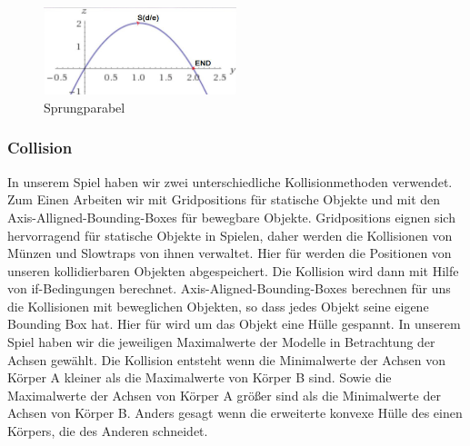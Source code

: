 \documentclass[10pt]{article}
\begin{document}
\begin{figure}[H]
	\centering
	\includegraphics[width=0.5\textwidth]{parabel}
	\caption{Sprungparabel
		\label{fig:parabel}}
\end{figure}

\vspace{0.5cm}
\subsubsection{Collision}

In unserem Spiel haben wir zwei unterschiedliche Kollisionmethoden verwendet.
Zum Einen Arbeiten wir mit Gridpositions für statische Objekte und mit den
Axis-Alligned-Bounding-Boxes für bewegbare Objekte.\newline
\newline
Gridpositions eignen sich hervorragend für statische Objekte in Spielen, daher werden die Kollisionen
von Münzen und Slowtraps von ihnen verwaltet. Hier für werden die Positionen von unseren kollidierbaren
Objekten abgespeichert. Die Kollision wird dann mit Hilfe von if-Bedingungen berechnet.\newline
\newline
Axis-Aligned-Bounding-Boxes berechnen für uns die Kollisionen mit beweglichen Objekten, so dass jedes Objekt seine eigene
Bounding Box hat. Hier für wird um das Objekt eine Hülle gespannt. In unserem Spiel haben wir die jeweiligen Maximalwerte
der Modelle in Betrachtung der Achsen gewählt. Die Kollision entsteht wenn die Minimalwerte der Achsen von Körper A kleiner
als die Maximalwerte von Körper B sind. Sowie die Maximalwerte der Achsen von Körper A größer sind als die Minimalwerte der
Achsen von Körper B. Anders gesagt wenn die erweiterte konvexe Hülle des einen Körpers, die des Anderen schneidet.
\end{document}
